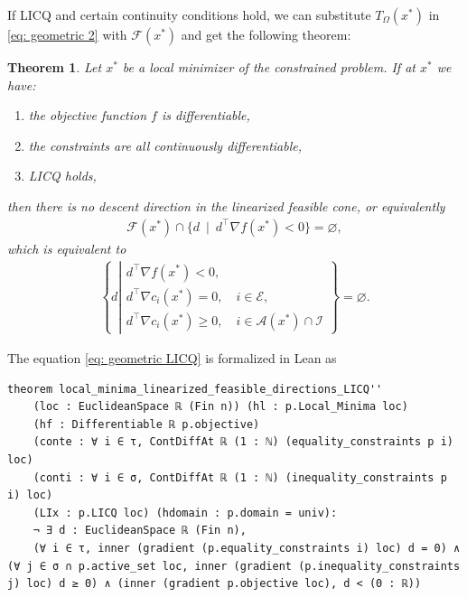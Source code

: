 \documentclass[sn-mathphys]{JORSC-jnl}%
\theoremstyle{thmstyleone}%
\newtheorem{theorem}{Theorem}%
\theoremstyle{thmstylethree}%
\begin{document}
If LICQ and certain continuity conditions hold, we can substitute $T_\Omega(x^\ast)$ in \eqref{eq: geometric 2} with $\mathcal{F}(x^\ast)$ and get the following theorem:
\begin{theorem}
    Let $x^\ast$ be a local minimizer of the constrained problem. If at $x^\ast$ we have:
\begin{enumerate}
    \item the objective function $f $ is differentiable,
    \item the constraints are all continuously differentiable,
    \item LICQ holds,
\end{enumerate}
then there is no descent direction in the linearized feasible cone, or equivalently
\begin{align}
\mathcal{F}(x^\ast) \cap \{d\ \mid \ d^\top \nabla f(x^\ast) < 0\} = \varnothing,
\end{align}
which is equivalent to
\begin{align}
\left\{d \left\lvert
\begin{array}{l}
d^\top \nabla f(x^*) < 0, \\
d^\top \nabla c_i(x^*) = 0, \quad i \in \mathcal{E}, \\
d^\top \nabla c_i(x^*) \geqslant 0, \quad i \in \mathcal{A}(x^*) \cap \mathcal{I}
\end{array}\right.\right\} = \varnothing.
\label{eq: geometric LICQ}
\end{align}
\end{theorem}
The equation \eqref{eq: geometric LICQ} is formalized in Lean as
\begin{lstlisting}
theorem local_minima_linearized_feasible_directions_LICQ''
    (loc : EuclideanSpace ℝ (Fin n)) (hl : p.Local_Minima loc)
    (hf : Differentiable ℝ p.objective)
    (conte : ∀ i ∈ τ, ContDiffAt ℝ (1 : ℕ) (equality_constraints p i) loc)
    (conti : ∀ i ∈ σ, ContDiffAt ℝ (1 : ℕ) (inequality_constraints p i) loc)
    (LIx : p.LICQ loc) (hdomain : p.domain = univ):
    ¬ ∃ d : EuclideanSpace ℝ (Fin n),
    (∀ i ∈ τ, inner (gradient (p.equality_constraints i) loc) d = 0) ∧ (∀ j ∈ σ ∩ p.active_set loc, inner (gradient (p.inequality_constraints j) loc) d ≥ 0) ∧ (inner (gradient p.objective loc), d < (0 : ℝ)) 
\end{lstlisting}
\end{document}
